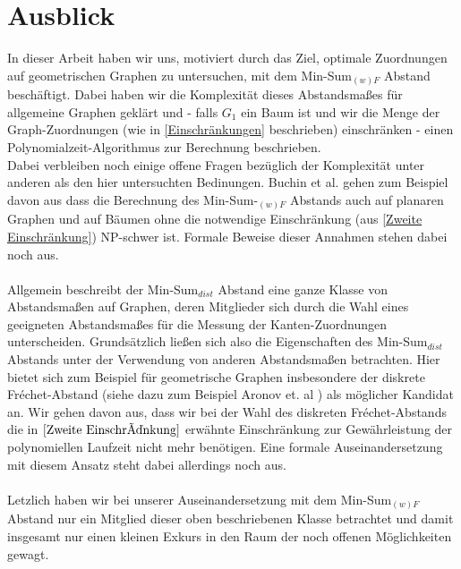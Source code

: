 \documentclass[a4paper, 12pt, twoside]{article}
\theoremstyle{Format1} %
\begin{document}
\newpage

\section{Ausblick}
In dieser Arbeit haben wir uns, motiviert durch das Ziel, optimale Zuordnungen auf geometrischen Graphen zu untersuchen, mit dem
Min-Sum$_{(w)F}$ Abstand beschäftigt. Dabei haben wir die Komplexität dieses Abstandsmaßes für allgemeine
Graphen geklärt und - falls $G_1$ ein Baum ist und wir die Menge der Graph-Zuordnungen (wie in \ref{Einschränkungen} beschrieben) einschränken -
einen Polynomialzeit-Algorithmus zur Berechnung beschrieben.
\\
Dabei verbleiben noch einige offene Fragen bezüglich der Komplexität unter anderen als den hier untersuchten Bedinungen.
Buchin et al. \cite{Buchin} gehen zum Beispiel davon aus dass die Berechnung des Min-Sum-$_{(w)F}$ Abstands auch auf planaren Graphen und
auf Bäumen ohne die notwendige Einschränkung (aus \ref{Zweite Einschränkung}) NP-schwer ist. Formale Beweise dieser Annahmen stehen dabei noch aus.
\\
\\
Allgemein beschreibt der Min-Sum$_{dist}$ Abstand eine ganze Klasse von Abstandsmaßen auf Graphen, deren Mitglieder sich durch die Wahl
eines geeigneten Abstandsmaßes für die Messung der Kanten-Zuordnungen unterscheiden.
Grundsätzlich ließen sich also die Eigenschaften des Min-Sum$_{dist}$ Abstands unter der Verwendung von anderen Abstandsmaßen betrachten.
Hier bietet sich zum Beispiel für geometrische Graphen insbesondere der
diskrete Fréchet-Abstand (siehe dazu zum Beispiel Aronov et. al \cite{Aronov}) als möglicher Kandidat an. Wir gehen davon aus, dass wir bei der Wahl
des diskreten Fréchet-Abstands die in $\ref{Zweite Einschränkung}$ erwähnte Einschränkung zur Gewährleistung der polynomiellen Laufzeit
nicht mehr benötigen. Eine formale Auseinandersetzung mit diesem Ansatz steht dabei allerdings noch aus.
\\
\\
Letzlich haben wir bei unserer Auseinandersetzung mit dem Min-Sum$_{(w)F}$ Abstand nur ein Mitglied dieser oben beschriebenen Klasse betrachtet und
damit insgesamt nur einen kleinen Exkurs in den Raum der noch offenen Möglichkeiten gewagt.
\newpage\null\thispagestyle{empty}\newpage
\end{document}
